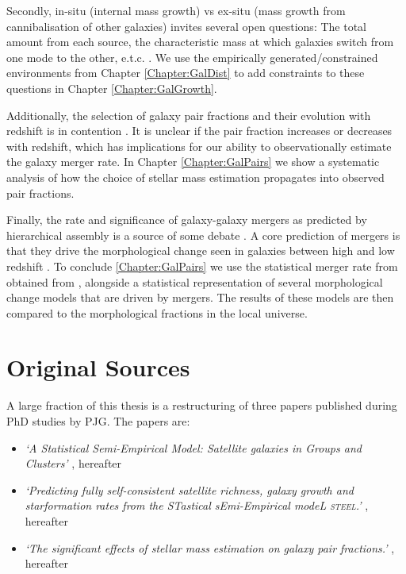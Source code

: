 Secondly, in-situ (internal mass growth) vs ex-situ (mass growth from cannibalisation of other galaxies) invites several open questions: The total amount from each source, the characteristic mass at which galaxies switch from one mode to the other, e.t.c.  \cite[e.g.]{Cattaneo2011HowMass, Moster2018Emerge10, Behroozi2019UniverseMachine:010, Bernardi2011Curvature1011M, Shankar2015}. We use the empirically generated/constrained environments from Chapter \ref{Chapter:GalDist} to add constraints to these questions in Chapter \ref{Chapter:GalGrowth}.

Additionally, the selection of galaxy pair fractions and their evolution with redshift is in contention \citet{Man2016RESOLVING03, Mundy2017A3.5}. It is unclear if the pair fraction increases or decreases with redshift, which has implications for our ability to observationally estimate the galaxy merger rate. In Chapter \ref{Chapter:GalPairs} we show a systematic analysis of how the choice of stellar mass estimation propagates into observed pair fractions.

Finally, the rate and significance of galaxy-galaxy mergers as predicted by \LCDM hierarchical assembly is a source of some debate \cite[e.g.][]{Hopkins2010MERGERSMATTER,Hopkins2009HOWMERGERS,Hopkins2010MergersFunctions,Fensch2017High-redshiftFormation,Martin2017TheTime}. A core prediction of mergers is that they drive the morphological change seen in galaxies between high and low redshift \cite[e.g.][]{Bournaud2011HydrodynamicsSpheroids,Bournaud2011StarMergers,Hilz2013}. To conclude \ref{Chapter:GalPairs} we use the statistical merger rate from obtained from \steel, alongside a statistical representation of several morphological change models that are driven by mergers. The results of these models are then compared to the morphological fractions in the local universe.

\section{Original Sources}

A large fraction of this thesis is a restructuring of three papers published during PhD studies by PJG. The papers are:
\begin{itemize}
    \item \textit{`A Statistical Semi-Empirical Model: Satellite galaxies in Groups and Clusters'}  \citet{Grylls2019AClusters}, hereafter 
    \item \textit{`Predicting fully self-consistent satellite richness, galaxy growth and starformation rates from the STastical sEmi-Empirical modeL \textsc{steel}.'} \citet{Grylls2020PredictingSTEEL}, hereafter 
    \item \textit{`The significant effects of stellar mass estimation on galaxy pair fractions.'} \citet{Grylls2020TheFractions}, hereafter 
\end{itemize}

